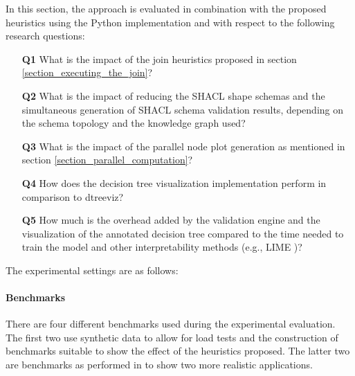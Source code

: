 In this section, the approach is evaluated in combination with the proposed heuristics using the Python implementation and with respect to the following research questions:

\begin{enumerate}
    \item[\textbf{Q1}] What is the impact of the join heuristics proposed in section \ref{section_executing_the_join}? %
    \item[\textbf{Q2}] What is the impact of reducing the SHACL shape schemas and the simultaneous generation of SHACL schema validation results, depending on the schema topology and the knowledge graph used? %
    \item[\textbf{Q3}] What is the impact of the parallel node plot generation as mentioned in section \ref{section_parallel_computation}?  %
    \item[\textbf{Q4}] How does the decision tree visualization implementation perform in comparison to dtreeviz? %
    \item[\textbf{Q5}] How much is the overhead added by the validation engine and the visualization of the annotated decision tree compared to the time needed to train the model and other interpretability methods (e.g., LIME \cite{ribeiro2016should})? %
\end{enumerate}

The experimental settings are as follows:
\paragraph{Benchmarks} There are four different benchmarks used during the experimental evaluation. The first two use synthetic data to allow for load tests and the construction of benchmarks suitable to show the effect of the heuristics proposed. The latter two are benchmarks as performed in \cite{interpretME} to show two more realistic applications.

